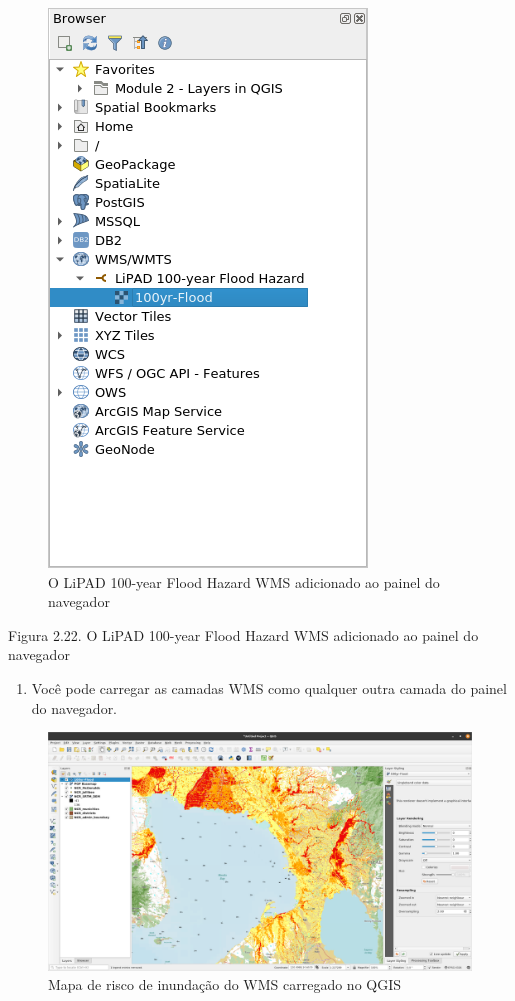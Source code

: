 \documentclass[
  portuguese,
]{krantz}
\providecommand{\tightlist}{%
  \setlength{\itemsep}{0pt}\setlength{\parskip}{0pt}}
\begin{document}
\begin{figure}
\centering
\includegraphics{media/modulo2/wms-2.png}
\caption{O LiPAD 100-year Flood Hazard WMS adicionado ao painel do navegador}
\end{figure}

Figura 2.22. O LiPAD 100-year Flood Hazard WMS adicionado ao painel do navegador

\begin{enumerate}
\def\labelenumi{\arabic{enumi}.}
\setcounter{enumi}{5}
\tightlist
\item
  Você pode carregar as camadas WMS como qualquer outra camada do painel do navegador.
\end{enumerate}

\begin{figure}
\centering
\includegraphics{media/modulo2/wms-3.png}
\caption{Mapa de risco de inundação do WMS carregado no QGIS}
\end{figure}
\end{document}
